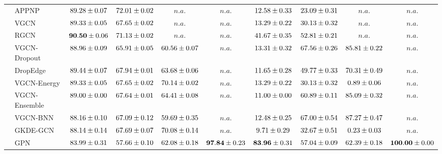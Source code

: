 \begin{table*}[!h]
{\begin{tabular}{ll|cccc|cccc}
        \midrule
        
        & APPNP & ${89.28\tiny \pm 0.07}$ & ${{72.01}\tiny \pm 0.02}$ & $n.a.$ & $n.a.$ & ${12.58\tiny \pm 0.33}$ & ${23.09\tiny \pm 0.31}$ & $n.a.$ & $n.a.$\\
        & VGCN & ${89.33\tiny \pm 0.05}$ & ${67.65\tiny \pm 0.02}$ & $n.a.$ & $n.a.$ & ${13.29\tiny \pm 0.22}$ & ${30.13\tiny \pm 0.32}$ & $n.a.$ & $n.a.$\\
        & RGCN & ${\mathbf{90.50}\tiny \pm 0.06}$ & ${71.13\tiny \pm 0.02}$ & $n.a.$ & $n.a.$ & ${41.67\tiny \pm 0.35}$ & ${52.81\tiny \pm 0.21}$ & $n.a.$ & $n.a.$\\
        & VGCN-Dropout & ${88.96\tiny \pm 0.09}$ & ${65.91\tiny \pm 0.05}$ & ${60.56\tiny \pm 0.07}$ & $n.a.$ & ${13.31\tiny \pm 0.32}$ & ${{67.56}\tiny \pm 0.26}$ & ${85.81\tiny \pm 0.22}$ & $n.a.$\\
        & DropEdge & ${89.44\tiny \pm 0.07}$ & ${67.94\tiny \pm 0.01}$ & ${63.68\tiny \pm 0.06}$ & $n.a.$ & ${11.65\tiny \pm 0.28}$ & ${49.77\tiny \pm 0.33}$ & ${70.31\tiny \pm 0.49}$ & $n.a.$\\
        & VGCN-Energy & ${89.33\tiny \pm 0.05}$ & ${67.65\tiny \pm 0.02}$ & ${{70.14}\tiny \pm 0.02}$ & $n.a.$ & ${13.29\tiny \pm 0.22}$ & ${30.13\tiny \pm 0.32}$ & ${0.89\tiny \pm 0.06}$ & $n.a.$\\
        & VGCN-Ensemble & ${89.00\tiny \pm 0.00}$ & ${67.64\tiny \pm 0.01}$ & ${64.41\tiny \pm 0.08}$ & $n.a.$ & ${11.00\tiny \pm 0.00}$ & ${60.89\tiny \pm 0.11}$ & ${85.09\tiny \pm 0.32}$ & $n.a.$\\
        & VGCN-BNN & ${88.16\tiny \pm 0.10}$ & ${67.09\tiny \pm 0.12}$ & ${59.69\tiny \pm 0.35}$ & $n.a.$ & ${12.48\tiny \pm 0.25}$ & ${67.00\tiny \pm 0.54}$ & ${{87.27}\tiny \pm 0.47}$ & $n.a.$\\
        & GKDE-GCN & ${88.14\tiny \pm 0.14}$ & ${67.69\tiny \pm 0.07}$ & ${70.08\tiny \pm 0.14}$ & $n.a.$ & ${9.71\tiny \pm 0.29}$ & ${32.67\tiny \pm 0.51}$ & ${0.23\tiny \pm 0.03}$ & $n.a.$\\
        & GPN & ${{83.99}\tiny \pm 0.31}$ & ${57.66\tiny \pm 0.10}$ & ${62.08\tiny \pm 0.18}$ & ${\mathbf{97.84}\tiny \pm 0.23}$ & ${\mathbf{83.96}\tiny \pm 0.31}$ & ${57.04\tiny \pm 0.09}$ & ${62.39\tiny \pm 0.18}$ & ${\mathbf{100.00}\tiny \pm 0.00}$\\
                

\end{tabular}}
\end{table*}
